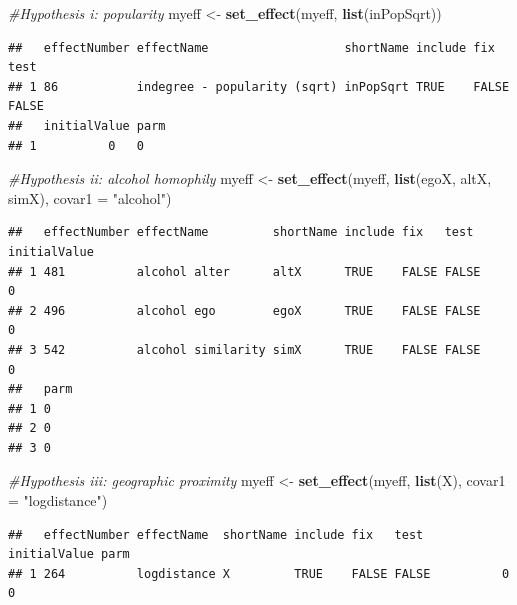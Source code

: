 \documentclass[
]{article}
\newenvironment{Shaded}{\begin{snugshade}}{\end{snugshade}}
\newcommand{\AttributeTok}[1]{\textcolor[rgb]{0.13,0.29,0.53}{#1}}
\newcommand{\CommentTok}[1]{\textcolor[rgb]{0.56,0.35,0.01}{\textit{#1}}}
\newcommand{\FunctionTok}[1]{\textcolor[rgb]{0.13,0.29,0.53}{\textbf{#1}}}
\newcommand{\NormalTok}[1]{#1}
\newcommand{\OtherTok}[1]{\textcolor[rgb]{0.56,0.35,0.01}{#1}}
\newcommand{\StringTok}[1]{\textcolor[rgb]{0.31,0.60,0.02}{#1}}
\begin{document}
\begin{Shaded}
\begin{Highlighting}[]
\CommentTok{\#Hypothesis i: popularity}
\NormalTok{myeff }\OtherTok{\textless{}{-}} \FunctionTok{set\_effect}\NormalTok{(myeff, }\FunctionTok{list}\NormalTok{(inPopSqrt))}
\end{Highlighting}
\end{Shaded}

\begin{verbatim}
##   effectNumber effectName                   shortName include fix   test 
## 1 86           indegree - popularity (sqrt) inPopSqrt TRUE    FALSE FALSE
##   initialValue parm
## 1          0   0
\end{verbatim}

\begin{Shaded}
\begin{Highlighting}[]
\CommentTok{\#Hypothesis ii: alcohol homophily}
\NormalTok{myeff }\OtherTok{\textless{}{-}} \FunctionTok{set\_effect}\NormalTok{(myeff, }\FunctionTok{list}\NormalTok{(egoX, altX, simX), }\AttributeTok{covar1 =} \StringTok{"alcohol"}\NormalTok{)}
\end{Highlighting}
\end{Shaded}

\begin{verbatim}
##   effectNumber effectName         shortName include fix   test  initialValue
## 1 481          alcohol alter      altX      TRUE    FALSE FALSE          0  
## 2 496          alcohol ego        egoX      TRUE    FALSE FALSE          0  
## 3 542          alcohol similarity simX      TRUE    FALSE FALSE          0  
##   parm
## 1 0   
## 2 0   
## 3 0
\end{verbatim}

\begin{Shaded}
\begin{Highlighting}[]
\CommentTok{\#Hypothesis iii: geographic proximity}
\NormalTok{myeff }\OtherTok{\textless{}{-}} \FunctionTok{set\_effect}\NormalTok{(myeff, }\FunctionTok{list}\NormalTok{(X), }\AttributeTok{covar1 =} \StringTok{"logdistance"}\NormalTok{)}
\end{Highlighting}
\end{Shaded}

\begin{verbatim}
##   effectNumber effectName  shortName include fix   test  initialValue parm
## 1 264          logdistance X         TRUE    FALSE FALSE          0   0
\end{verbatim}
\end{document}
